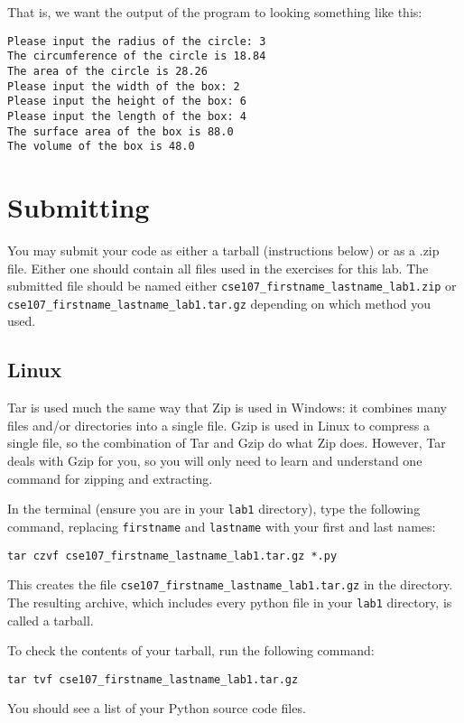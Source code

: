 \documentclass[11pt]{cselabheader}
\begin{document}
That is, we want the output of the program to looking something like this:

\begin{lstlisting}[style=bash]
Please input the radius of the circle: 3
The circumference of the circle is 18.84
The area of the circle is 28.26
Please input the width of the box: 2
Please input the height of the box: 6
Please input the length of the box: 4
The surface area of the box is 88.0
The volume of the box is 48.0
\end{lstlisting}

\pagebreak
\section{Submitting}

You may submit your code as either a tarball (instructions below) or as a .zip
file. Either one should contain all files used in the exercises for this lab.
The submitted file should be named either
\texttt{cse107\_firstname\_lastname\_lab1.zip} or
\texttt{cse107\_firstname\_lastname\_lab1.tar.gz} depending on which method you
used.

\subsection{Linux}

Tar is used much the same way that Zip is used in Windows: it combines many
files and/or directories into a single file. Gzip is used in Linux to compress a
single file, so the combination of Tar and Gzip do what Zip does. However, Tar
deals with Gzip for you, so you will only need to learn and understand one
command for zipping and extracting.

In the terminal (ensure you are in your \texttt{lab1} directory), type the
following command, replacing \texttt{firstname} and \texttt{lastname} with your
first and last names:

\begin{lstlisting}[style=bash]
tar czvf cse107_firstname_lastname_lab1.tar.gz *.py
\end{lstlisting}

This creates the file \texttt{cse107\_firstname\_lastname\_lab1.tar.gz} in the
directory. The resulting archive, which includes every python file in your
\texttt{lab1} directory, is called a tarball. 

To check the contents of your tarball, run the following command:

\begin{lstlisting}[style=bash]
tar tvf cse107_firstname_lastname_lab1.tar.gz
\end{lstlisting}

You should see a list of your Python source code files.
\end{document}
